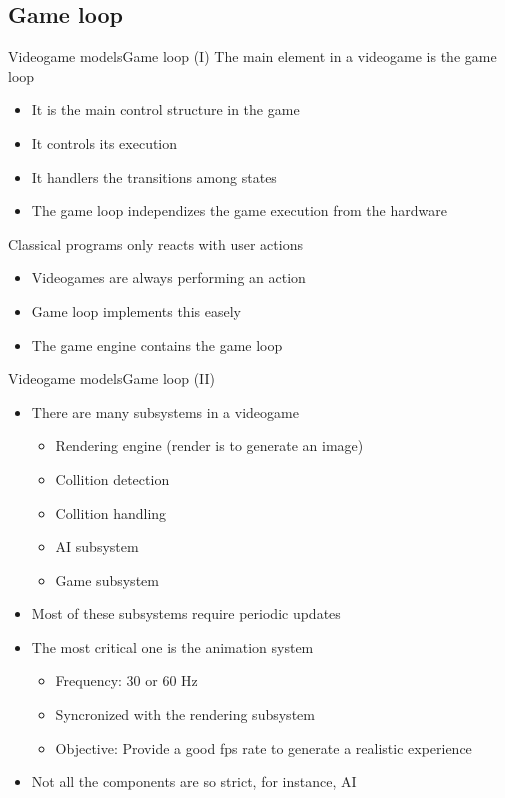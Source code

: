 \documentclass[10pt,compress]{beamer} %
\begin{document}
\subsection{Game loop}
\begin{frame}{Videogame models}{Game loop (I)}
	   	The main element in a videogame is the \alert{game loop}
		\begin{itemize}
			\item It is the main control structure in the game
			\item It controls its execution
			\item It handlers the transitions among states
			\item The game loop independizes the game execution from the hardware
		\end{itemize}
		Classical programs only reacts with user actions
		\begin{itemize}
			\item Videogames are always performing an action
			\item Game loop implements this easely
			\item The game engine contains the game loop
		\end{itemize}
\end{frame}

\begin{frame}{Videogame models}{Game loop (II)}
		\begin{itemize}
		   	\item There are many subsystems in a videogame
			\begin{itemize}
				\item Rendering engine (render is to generate an image)
				\item Collition detection
				\item Collition handling
				\item AI subsystem
					\item Game subsystem
			\end{itemize}
			\item Most of these subsystems require periodic updates
			\item The most critical one is the animation system
			\begin{itemize}
				\item Frequency: 30 or 60 Hz
				\item Syncronized with the rendering subsystem
				\item Objective: Provide a good fps rate to generate a realistic experience
			\end{itemize}
			\item Not all the components are so strict, for instance, AI
		\end{itemize}
\end{frame}
\end{document}
